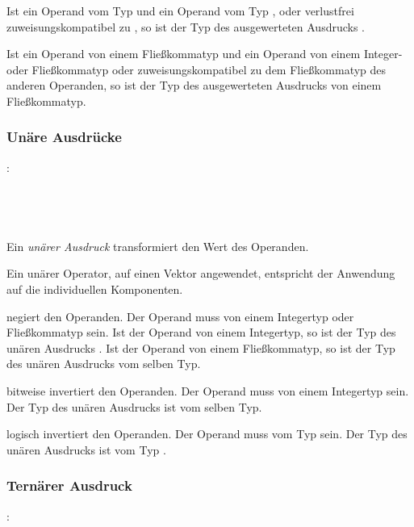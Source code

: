 Ist ein Operand vom Typ  und ein Operand vom Typ ,  oder
verlustfrei zuweisungskompatibel zu , so ist der Typ des ausgewerteten Ausdrucks .

Ist ein Operand von einem Fließkommatyp und ein Operand von einem Integer- oder Fließkommatyp
oder zuweisungskompatibel zu dem Fließkommatyp des anderen Operanden,
so ist der Typ des ausgewerteten Ausdrucks von einem Fließkommatyp.


\subsubsection{Unäre Ausdrücke}\label{Unaere Ausdruecke}
:\label{asdr_unaer}\\
\hspace*{1cm}\glq\Gt{$\sim$}\grq  {} \\
\hspace*{1cm}\glq\Gt{-}\grq  {} \\
\hspace*{1cm}\glq\Gt{!}\grq  {} \\
\hspace*{1cm} \\

Ein \emph{unärer Ausdruck} transformiert den Wert des Operanden.

Ein unärer Operator, auf einen Vektor angewendet, entspricht der Anwendung auf die individuellen Komponenten.

\op{-} negiert den Operanden. Der Operand muss von einem Integertyp oder Fließkommatyp sein.
Ist der Operand von einem Integertyp, so ist der Typ des unären Ausdrucks .
Ist der Operand von einem Fließkommatyp, so ist der Typ des unären Ausdrucks vom selben Typ.

\op{$\sim$} bitweise invertiert den Operanden. Der Operand muss von einem Integertyp sein. Der Typ des unären Ausdrucks ist vom selben Typ.

\op{!} logisch invertiert den Operanden. Der Operand muss vom Typ  sein. Der Typ des unären Ausdrucks ist vom Typ .

\subsubsection{Ternärer Ausdruck}\label{Ternaerer Ausdruck}
:\label{asdr_ternaer}\\
\hspace*{1cm} \\
\hspace*{1cm} \glq{}\grq  {}  \glq\Gt{:}\grq  {} \\

